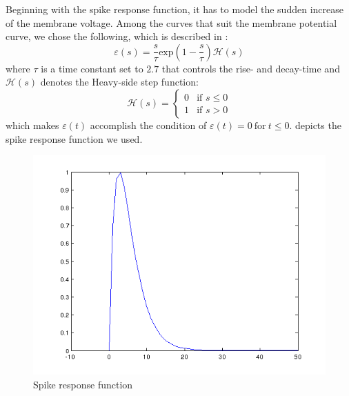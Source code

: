 Beginning with the spike response function, it has to model the sudden increase of the membrane voltage. Among the curves that suit the membrane potential curve, we chose the following, which is described in \cite{booij2004temporal}:
\begin{equation}
\varepsilon(s)=\frac{s}{\tau}\text{exp}(1-\frac{s}{\tau})\mathcal{H}(s)
\label{eq:spikeresponsefunction}
\end{equation}
where $\tau$ is a time constant set to $2.7$ that controls the rise- and decay-time and $\mathcal{H}(s)$ denotes the Heavy-side step function:
\begin{equation}
\mathcal{H}(s)=
	\begin{cases}
    	0 & \text{if } s \leq 0\\
    	1 & \text{if } s > 0
  	\end{cases}
  	\label{eq:heaviside}
\end{equation}
which makes $\varepsilon(t)$ accomplish the condition of $\varepsilon(t)=0~\text{for}~t\leq 0$.  depicts the spike response function we used.
\begin{figure}[!ht]
\centering
\includegraphics[width=0.82\columnwidth]{images/results/spikeresponsefunction.png}
\caption{Spike response function}
\label{fig:spikeresponsefunctionPlot}
\end{figure}


